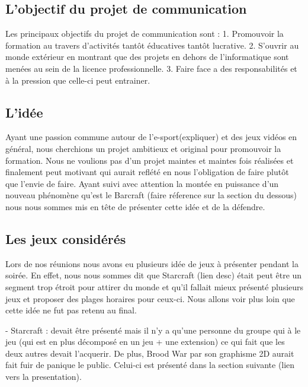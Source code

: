 \subsection{L'objectif du projet de communication}%
\label{sub:l_objectif_du_projet_de_communication}

Les principaux objectifs du projet de communication sont : 1. Promouvoir
la formation au travers d'activités tantôt éducatives tantôt lucrative.
2. S'ouvrir au monde extérieur en montrant que des projets en dehors de
l'informatique sont menées au sein de la licence professionnelle.  3.
Faire face a des responsabilités et à la pression que celle-ci peut
entrainer.

\subsection{L'idée}%
\label{sub:l_idee}

Ayant une passion commune autour de l'e-sport(expliquer) et des jeux
vidéos en général, nous cherchions un projet ambitieux et original
pour promouvoir la formation. Nous ne voulions pas d'un projet maintes
et maintes fois réalisées et finalement peut motivant qui aurait
reflété en nous l'obligation de faire plutôt que l'envie de faire.
Ayant suivi avec attention la montée en puissance d'un nouveau
phénomène qu'est le Barcraft (faire réference sur la section du
dessous) nous nous sommes mis en tête de présenter cette idée et de la
défendre.

\subsection{Les jeux considérés}%
\label{sub:les_jeux_consideres}

Lors de nos réunions nous avons eu plusieurs idée de jeux à présenter
pendant la soirée. En effet, nous nous sommes dit que Starcraft (lien
desc) était peut être un segment trop étroit pour attirer du monde et
qu'il fallait mieux présenté plusieurs jeux et proposer des plages
horaires pour ceux-ci. Nous allons voir plus loin que cette idée ne fut
pas retenu au final.

- Starcraft : devait être présenté mais il n'y a qu'une personne du
groupe qui à le jeu (qui est en plus décomposé en un jeu + une
extension) ce qui fait que les deux autres devait l'acquerir. De
plus, Brood War par son graphisme 2D aurait fait fuir de panique le
public. Celui-ci est présenté dans la section suivante (lien vers la
presentation).

